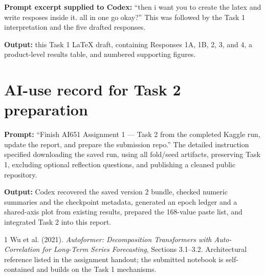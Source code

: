 \documentclass[11pt,a4paper]{article}
\begin{document}
\textbf{Prompt excerpt supplied to Codex:} ``then i want you to create the latex and write resposes inside it. all in one go okay?'' This was followed by the Task 1 interpretation and the five drafted responses.

\textbf{Output:} this Task 1 LaTeX draft, containing Responses 1A, 1B, 2, 3, and 4, a product-level results table, and numbered supporting figures.

\section*{AI-use record for Task 2 preparation}
\textbf{Prompt:} ``Finish AI651 Assignment 1 --- Task 2 from the completed Kaggle run, update the report, and prepare the submission repo.'' The detailed instruction specified downloading the saved run, using all fold/seed artifacts, preserving Task 1, excluding optional reflection questions, and publishing a cleaned public repository.

\textbf{Output:} Codex recovered the saved version 2 bundle, checked numeric summaries and the checkpoint metadata, generated an epoch ledger and a shared-axis plot from existing results, prepared the 168-value paste list, and integrated Task 2 into this report.

\begin{thebibliography}{1}
 Wu et al. (2021). \emph{Autoformer: Decomposition Transformers with Auto-Correlation for Long-Term Series Forecasting}, Sections 3.1--3.2. Architectural reference listed in the assignment handout; the submitted notebook is self-contained and builds on the Task 1 mechanisms.
\end{thebibliography}
\end{document}

